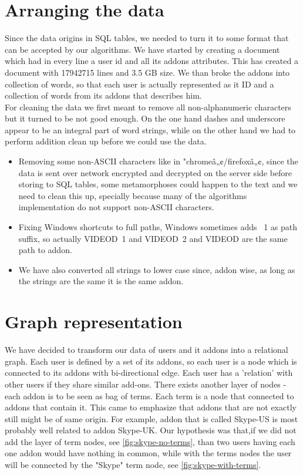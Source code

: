\documentclass[11pt,oneside]{book}
\let\Oldsection\section
\renewcommand{\section}{\FloatBarrier\Oldsection}
\begin{document}
\section{Arranging the data}
Since the data origins in SQL tables, we needed to turn it to some format that can be accepted by our algorithms. We have started by creating a document which had in every line a user id and all its addons attributes. This has created a document with 17942715 lines and 3.5 GB size. We than broke the addons into collection of words, so that each user is actually represented as it ID and a collection of words from its addons that describes him.\\
For cleaning the data we first meant to remove all non-alphanumeric characters but it turned to be not good enough. On the one hand dashes and underscore appear to be an integral part of word strings, while on the other hand we had to perform addition clean up before we could use the data.
\begin{itemize}
\renewcommand{\labelitemi}{$\bullet$} 
\item Removing some non-ASCII characters like in "chromeâ„¢/firefoxâ„¢, since the data is sent over network encrypted and decrypted on the server side before storing to SQL tables, some metamorphoses could happen to the text and we need to clean this up, specially because many of the algorithms implementation do not support non-ASCII characters.
\item Fixing Windows shortcuts to full paths, Windows sometimes adds ~1 as path suffix, so actually VIDEOD~1 and VIDEOD~2 and VIDEOD are the same path to addon.
\item We have also converted all strings to lower case since, addon wise, as long as the strings are the same it is the same addon.
\end{itemize}


\section{Graph representation}
We have decided to transform our data of users and it addons into a relational graph. Each user is defined by a set of its addons, so each user is a node which is connected to its addons with bi-directional edge. Each user has a 'relation' with other users if they share similar add-ons. There exists another layer of nodes - each addon is to be seen as bag of terms. Each term is a node that connected to addons that contain it. This came to emphasize that addons that are not exactly still might be of same origin. For example, addon that is called Skype-US is most probably well related to addon Skype-UK. Our hypothesis was that,if we did not add the layer of term nodes, see \ref{fig:skype-no-terms}, than two users having each one addon would have nothing in common, while with the terms nodes the user will be connected by the "Skype" term node, see \ref{fig:skype-with-terms}.\\
\end{document}
